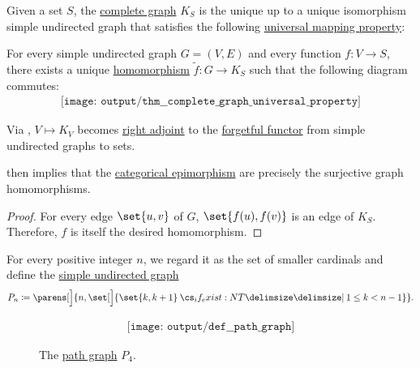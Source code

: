 \begin{theorem}\label{thm:complete_graph_universal_property}
  Given a set \( S \), the \hyperref[def:complete_graph]{complete graph} \( K_S \) is the unique up to a unique isomorphism simple undirected graph that satisfies the following \hyperref[rem:universal_mapping_property]{universal mapping property}:
  \begin{displayquote}
    For every simple undirected graph \( G = (V, E) \) and every function \( f: V \to S \), there exists a unique \hyperref[def:undirected_graph/homomorphism]{homomorphism} \( \widetilde{f}: G \to K_S \) such that the following diagram commutes:
    \begin{equation}\label{eq:thm:complete_graph_universal_property/diagram}
      \begin{aligned}
        \texttt{[image: output/thm\_\_complete\_graph\_universal\_property]}
      \end{aligned}
    \end{equation}
  \end{displayquote}
\end{theorem}
\begin{comments}
  \item Via , \( V \mapsto K_V \) becomes \hyperref[def:category_adjunction]{right adjoint} to the \hyperref[def:concrete_category]{forgetful functor} from simple undirected graphs to sets.

   then implies that the \hyperref[def:morphism_invertibility/right_cancellative]{categorical epimorphism} are precisely the surjective graph homomorphisms.
\end{comments}
\begin{proof}
  For every edge \( \set{ u, v } \) of \( G \), \( \set{ f(u), f(v) } \) is an edge of \( K_S \). Therefore, \( f \) is itself the desired homomorphism.
\end{proof}

\begin{definition}\label{def:path_graph}
  For every positive integer \( n \), we regard it as the set of smaller cardinals and define the \hyperref[def:undirected_graph]{simple undirected graph}
  \begin{equation*}
    P_n \coloneqq \parens[\Big]{ n, \set[\Big]{ \set{ k, k + 1 } \given* 1 \leq k < n - 1 } }.
  \end{equation*}

  \begin{figure}[!ht]
    \begin{equation}\label{eq:fig:def:path_graph/p4}
      \begin{aligned}
        \texttt{[image: output/def\_\_path\_graph]}
      \end{aligned}
    \end{equation}
    \caption{The \hyperref[def:path_graph]{path graph} \( P_4 \).}\label{fig:def:path_graph/p4}
  \end{figure}
\end{definition}


